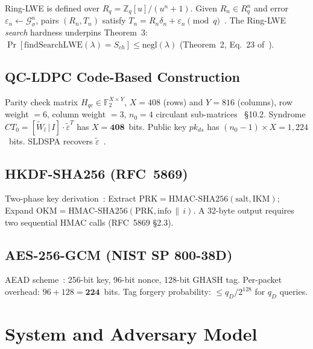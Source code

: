 \documentclass[conference]{IEEEtran}
\begin{document}
Ring-LWE is defined over $R_q = \mathbb{Z}_q[u]/(u^n+1)$. Given
$R_n \in R_q^n$ and error $\varepsilon_n \leftarrow \mathcal{G}^n_\sigma$,
pairs $(R_n, T_n)$ satisfy $T_n = R_n\delta_n + \varepsilon_n
\pmod{q}$~\cite{lyubashevsky2013,regev2009}. The Ring-LWE
\emph{search} hardness underpins Theorem~3:
$\Pr[\mathrm{findSearchLWE}(\lambda) = S_{ch}] \leq \mathrm{negl}(\lambda)$
(Theorem~2, Eq.~23 of~\cite{kumari2022}).

\subsection{QC-LDPC Code-Based Construction}

Parity check matrix $H_{qc} \in \mathbb{F}_2^{X \times Y}$, $X = 408$ (rows) and $Y = 816$ (columns),
row weight $= 6$, column weight $= 3$, $n_0 = 4$ circulant sub-matrices~\cite{kumari2022} \S10.2.
Syndrome $CT_0 = [\tilde{W}_l\,|\,I] \cdot \tilde{\varepsilon}^T$ has $X = \mathbf{408}$~bits.
Public key $pk_{ds}$ has $(n_0-1) \times X = 1{,}224$~bits.
SLDSPA recovers $\tilde{\varepsilon}$~\cite{gallager1962,baldi2016}.

\subsection{HKDF-SHA256 (RFC~5869)}

Two-phase key derivation~\cite{rfc5869}: Extract
$\mathrm{PRK} = \mathrm{HMAC\text{-}SHA256}(\mathrm{salt, IKM})$;
Expand $\mathrm{OKM} = \mathrm{HMAC\text{-}SHA256}(\mathrm{PRK,
info}\,\|\,i)$. A 32-byte output requires two sequential HMAC calls
(RFC~5869 \S2.3).

\subsection{AES-256-GCM (NIST SP 800-38D)}

AEAD scheme~\cite{nist38d}: 256-bit key, 96-bit nonce, 128-bit GHASH
tag. Per-packet overhead: $96 + 128 = \mathbf{224}$~bits. Tag
forgery probability: $\leq q_D/2^{128}$ for $q_D$ queries.

\section{System and Adversary Model}
\label{sec:model}
\end{document}
